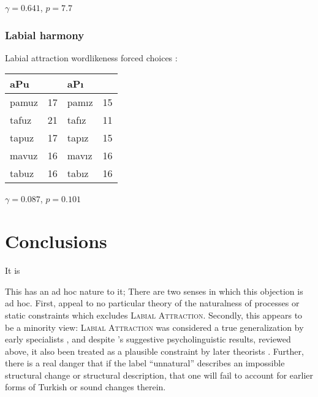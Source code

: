 $\gamma = 0.641$, $p = 7.7$


\subsubsection{Labial harmony}

\begin{example}
Labial attraction wordlikeness forced choices \citep[314]{Zimmer1969}: 

\vspace{0.5\baselineskip}
\begin{tabular}{l r l r}
\toprule
\multicolumn{2}{l}{aPu} & \multicolumn{2}{l}{aPı} \\
\midrule
pamuz & 17              & pamız & 15 \\
tafuz & 21              & tafız & 11 \\
tapuz & 17              & tapız & 15 \\
mavuz & 16              & mavız & 16 \\
tabuz & 16              & tabız & 16 \\
\bottomrule
\end{tabular}
\end{example}

$\gamma = 0.087$, $p = 0.101$

\section{Conclusions}

\citet{Becker2011}

It is 

This has an ad hoc nature to it; 
There are two senses in which this objection is ad hoc. 
First, \citeauthor{Becker2011} appeal to no particular theory of the naturalness of processes or static constraints which excludes \textsc{Labial Attraction}. 
Secondly, this appears to be a minority view: \textsc{Labial Attraction} was considered a true generalization by early specialists
\citep[e.g.,][]{Lees1966a}, and despite \citeauthor{Zimmer1969}'s suggestive psycholinguistic results, reviewed above, it also been treated as a plausible constraint by later theorists \citep[e.g.,][]{NiChiosain1993,Ito1993,Ito1995a,Zuraw2000}.
Further, there is a real danger that if the label ``unnatural'' 
describes an impossible structural change or structural description, that one will fail to account for earlier forms of Turkish or sound changes therein.

